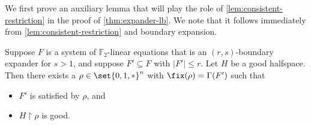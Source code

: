 We first prove an auxiliary lemma that will play the role of \autoref{lem:consistent-restriction} in the proof of \autoref{thm:expander-lb}.
We note that it follows immediately from \autoref{lem:consistent-restriction} and boundary expansion.
\begin{lemma}\label{lem:boundary-cleanup}
	Suppose $F$ is a system of $\mathbb{F}_2$-linear equations that is an $(r, s)$-boundary expander for $s > 1$, and suppose $F' \subseteq F$ with $|F'| \leq r$.
	Let $H$ be a good halfspace.
	Then there exists a $\rho \in \set{0,1,*}^n$ with $\fix(\rho) = \Gamma(F')$ such that 
	\begin{itemize}
		\item $F'$ is satisfied by $\rho$, and
		\item $H \restriction \rho$ is good.
	\end{itemize}
\end{lemma}

